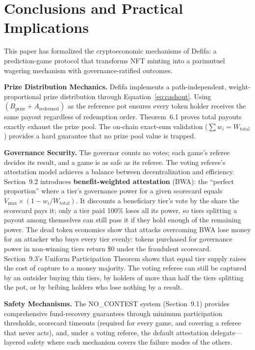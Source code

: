 \documentclass[11pt,a4paper]{article}
\begin{document}
\section{Conclusions and Practical Implications}

This paper has formalized the cryptoeconomic mechanisms of Defifa: a prediction-game protocol that transforms NFT minting into a parimutuel wagering mechanism with governance-ratified outcomes.

\textbf{Prize Distribution Mechanics.} Defifa implements a path-independent, weight-proportional prize distribution through Equation~\ref{eq:cashout}. Using $(B_{\text{prize}} + A_{\text{redeemed}})$ as the reference pot ensures every token holder receives the same payout regardless of redemption order. Theorem~6.1 proves total payouts exactly exhaust the prize pool. The on-chain exact-sum validation ($\sum w_i = W_{\text{total}}$) provides a hard guarantee that no prize pool value is trapped.

\textbf{Governance Security.} The governor counts no votes; each game's referee decides its result, and a game is as safe as its referee. The voting referee's attestation model achieves a balance between decentralization and efficiency. Section~9.2 introduces \textbf{benefit-weighted attestation} (BWA): the ``perfect proportion'' where a tier's governance power for a given scorecard equals $V_{\text{max}} \times (1 - w_i / W_{\text{total}})$. It discounts a beneficiary tier's vote by the share the scorecard pays it; only a tier paid 100\% loses all its power, so tiers splitting a payout among themselves can still pass it if they hold enough of the remaining power. The dead token economics show that attacks overcoming BWA lose money for an attacker who buys every tier evenly: tokens purchased for governance power in non-winning tiers return \$0 under the fraudulent scorecard. Section~9.3's Uniform Participation Theorem shows that equal tier supply raises the cost of capture to a money majority. The voting referee can still be captured by an outsider buying thin tiers, by holders of more than half the tiers splitting the pot, or by bribing holders who lose nothing by a result.

\textbf{Safety Mechanisms.} The NO\_CONTEST system (Section~9.1) provides comprehensive fund-recovery guarantees through minimum participation thresholds, scorecard timeouts (required for every game, and covering a referee that never acts), and, under a voting referee, the default attestation delegate---layered safety where each mechanism covers the failure modes of the others.
\end{document}
